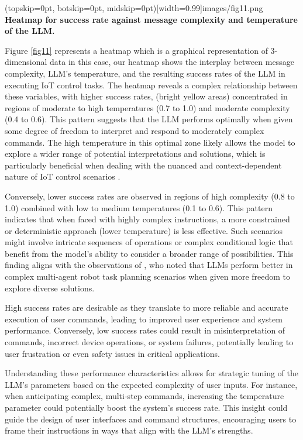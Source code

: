 \documentclass{ieeeaccess}
\begin{document}
\Figure[t!](topskip=0pt, botskip=0pt,
midskip=0pt)[width=0.99\columnwidth]{{images/fig11.png}}
{ \textbf{Heatmap for success rate against message complexity and temperature of the LLM.}\label{fig11}}

Figure \ref{fig11} represents a heatmap which is a graphical representation of 3-dimensional data in this case, our heatmap shows the interplay between message complexity, LLM's temperature, and the resulting success rates of the LLM in executing IoT control tasks. The heatmap reveals a complex relationship between these variables, with higher success rates, (bright yellow areas) concentrated in regions of moderate to high temperatures (0.7 to 1.0) and moderate complexity (0.4 to 0.6). This pattern suggests that the LLM performs optimally when given some degree of freedom to interpret and respond to moderately complex commands. The high temperature in this optimal zone likely allows the model to explore a wider range of potential interpretations and solutions, which is particularly beneficial when dealing with the nuanced and context-dependent nature of IoT control scenarios \cite{10315791}. 

Conversely, lower success rates are observed in regions of high complexity (0.8 to 1.0) combined with low to medium temperatures (0.1 to 0.6). This pattern indicates that when faced with highly complex instructions, a more constrained or deterministic approach (lower temperature) is less effective. Such scenarios might involve intricate sequences of operations or complex conditional logic that benefit from the model's ability to consider a broader range of possibilities. This finding aligns with the observations of \citet{kannan2024smartllmsmartmultiagentrobot}, who noted that LLMs perform better in complex multi-agent robot task planning scenarios when given more freedom to explore diverse solutions. 

High success rates are desirable as they translate to more reliable and accurate execution of user commands, leading to improved user experience and system performance. Conversely, low success rates could result in misinterpretation of commands, incorrect device operations, or system failures, potentially leading to user frustration or even safety issues in critical applications. 

Understanding these performance characteristics allows for strategic tuning of the LLM's parameters based on the expected complexity of user inputs. For instance, when anticipating complex, multi-step commands, increasing the temperature parameter could potentially boost the system's success rate. This insight could guide the design of user interfaces and command structures, encouraging users to frame their instructions in ways that align with the LLM's strengths.
\end{document}
